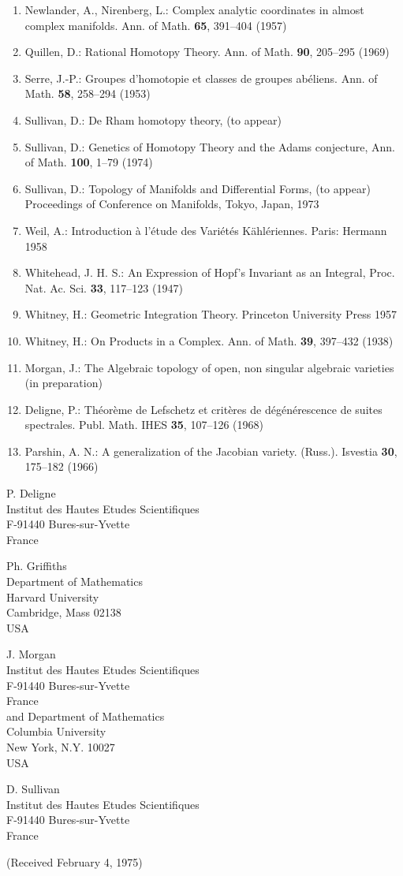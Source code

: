 \documentclass[
  english,
  a3paper,
  a3paper]{extarticle}
\begin{document}
\begin{enumerate}
  Also Amer. Math. Soc. Translations, ser. 2 vol.~63 (1967)
\item
  Newlander, A., Nirenberg, L.: Complex analytic coordinates in almost
  complex manifolds. Ann. of Math. \textbf{65}, 391--404 (1957)
\item
  Quillen, D.: Rational Homotopy Theory. Ann. of Math. \textbf{90},
  205--295 (1969)
\item
  Serre, J.-P.: Groupes d'homotopie et classes de groupes abéliens. Ann.
  of Math. \textbf{58}, 258--294 (1953)
\item
  Sullivan, D.: De Rham homotopy theory, (to appear)
\item
  Sullivan, D.: Genetics of Homotopy Theory and the Adams conjecture,
  Ann. of Math. \textbf{100}, 1--79 (1974)
\item
  Sullivan, D.: Topology of Manifolds and Differential Forms, (to
  appear) Proceedings of Conference on Manifolds, Tokyo, Japan, 1973
\item
  Weil, A.: Introduction à l'étude des Variétés Kählériennes. Paris:
  Hermann 1958
\item
  Whitehead, J. H. S.: An Expression of Hopf's Invariant as an Integral,
  Proc. Nat. Ac. Sci. \textbf{33}, 117--123 (1947)
\item
  Whitney, H.: Geometric Integration Theory. Princeton University Press
  1957
\item
  Whitney, H.: On Products in a Complex. Ann. of Math. \textbf{39},
  397--432 (1938)
\item
  Morgan, J.: The Algebraic topology of open, non singular algebraic
  varieties (in preparation)
\item
  Deligne, P.: Théorème de Lefschetz et critères de dégénérescence de
  suites spectrales. Publ. Math. IHES \textbf{35}, 107--126 (1968)
\item
  Parshin, A. N.: A generalization of the Jacobian variety. (Russ.).
  Isvestia \textbf{30}, 175--182 (1966)
\end{enumerate}

P. Deligne\\
Institut des Hautes Etudes Scientifiques\\
F-91440 Bures-sur-Yvette\\
France

Ph. Griffiths\\
Department of Mathematics\\
Harvard University\\
Cambridge, Mass 02138\\
USA

J. Morgan\\
Institut des Hautes Etudes Scientifiques\\
F-91440 Bures-sur-Yvette\\
France\\
and Department of Mathematics\\
Columbia University\\
New York, N.Y. 10027\\
USA

D. Sullivan\\
Institut des Hautes Etudes Scientifiques\\
F-91440 Bures-sur-Yvette\\
France

(Received February 4, 1975)
\end{document}
